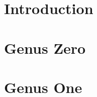 \documentclass{article}
\begin{document}
\section{Introduction}
\label{sec:Introduction}






\section{Genus Zero}
\label{sec:Genus Zero}

\section{Genus One}
\label{sec:Genus One}







\end{document}
